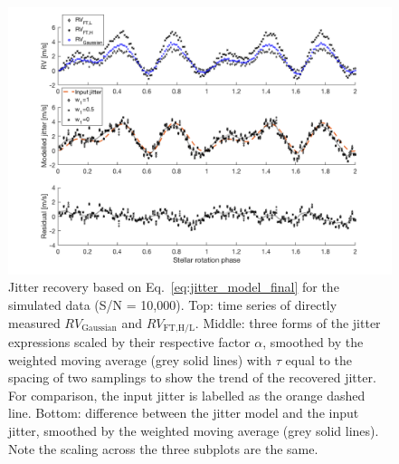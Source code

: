 \begin{figure}[tbp]
\centering
\includegraphics[width = 0.99 \linewidth]
{./Figures/Methods/5-PLANET_AND_JITTER2.png}
\caption[Jitter model]
{Jitter recovery based on Eq.~\ref{eq:jitter_model_final} for the simulated data (S/N = 10,000). Top: time series of directly measured $RV_\text{Gaussian}$ and $RV_\text{FT,H/L}$. Middle: three forms of the jitter expressions scaled by their respective factor $\alpha$, smoothed by the weighted moving average (grey solid lines) with $\tau$ equal to the spacing of two samplings to show the trend of the recovered jitter. For comparison, the input jitter is labelled as the orange dashed line. Bottom: difference between the jitter model and the input jitter, smoothed by the weighted moving average (grey solid lines). Note the scaling across the three subplots are the same.}
\label{fig:PLANET_AND_JITTER}
\end{figure} 

